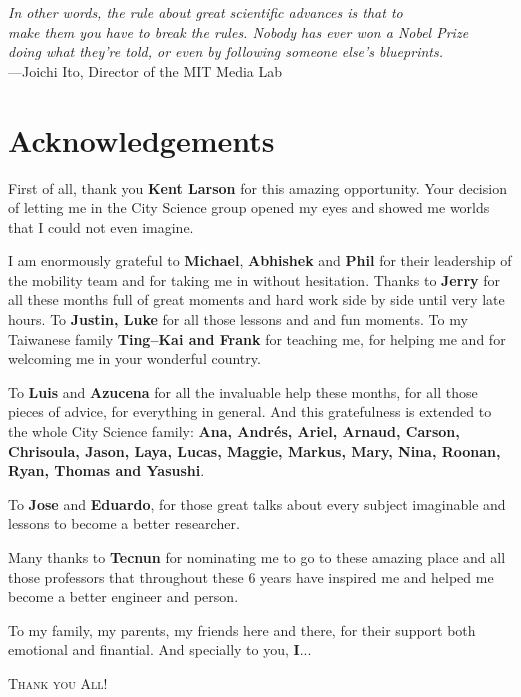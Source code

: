 

\begin{flushright}{\slshape    
In other words, the rule about great scientific advances is that to \\ 
make them you have to break the rules. Nobody has ever won a Nobel Prize \\ 
doing what they’re told, or even by following someone else’s blueprints.} \\ \medskip
---{Joichi Ito, Director of the MIT Media Lab}
\end{flushright}

\bigskip



\begingroup

\let\clearpage\relax
\let\cleardoublepage\relax
\let\cleardoublepage\relax

\chapter*{Acknowledgements}

First of all, thank you \textbf{Kent Larson} for this amazing opportunity. Your decision of letting me in the City Science group opened my eyes and showed me worlds that I could not even imagine. \bigskip

I am enormously grateful to \textbf{Michael}, \textbf{Abhishek} and \textbf{Phil} for their leadership of the mobility team and for taking me in without hesitation. Thanks to \textbf{Jerry} for all these months full of great moments and hard work side by side until very late hours. To \textbf{Justin, Luke} for all those lessons and and fun moments. To my Taiwanese family \textbf{Ting--Kai and Frank} for teaching me, for helping me and for welcoming me in your wonderful country.\bigskip

To \textbf{Luis} and \textbf{Azucena} for all the invaluable help these months, for all those pieces of advice, for everything in general. And this gratefulness is extended to the whole City Science family: \textbf{Ana, Andr\'es, Ariel, Arnaud, Carson, Chrisoula, Jason, Laya, Lucas, Maggie, Markus, Mary, Nina, Roonan, Ryan, Thomas and Yasushi}. \bigskip

To \textbf{Jose} and \textbf{Eduardo}, for those great talks about every subject imaginable and lessons to become a better researcher.\bigskip

Many thanks to \textbf{Tecnun} for nominating me to go to these amazing place and all those professors that throughout these 6 years have inspired me and helped me become a better engineer and person. \bigskip

To my family, my parents, my friends here and there, for their support both emotional and finantial. And specially to you, \textbf{I}...\bigskip

\textsc{Thank you All!}
\endgroup